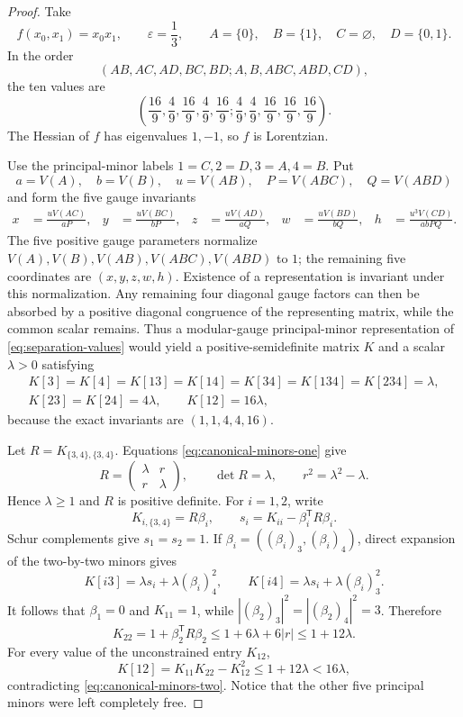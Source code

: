 \documentclass[11pt]{article}
\theoremstyle{remark}
\begin{document}
\begin{proof}
Take
\[
 f(x_0,x_1)=x_0x_1,\qquad \varepsilon=\frac13,
 \qquad A=\{0\},\quad B=\{1\},\quad C=\varnothing,
 \quad D=\{0,1\}.
\]
In the order
\[
 (AB,AC,AD,BC,BD;A,B,ABC,ABD,CD),
\]
the ten values are
\begin{equation}
 \left(
 \frac{16}{9},\frac49,\frac{16}{9},\frac49,\frac{16}{9};
 \frac49,\frac49,\frac{16}{9},\frac{16}{9},\frac{16}{9}
 \right).
 \label{eq:separation-values}
\end{equation}
The Hessian of $f$ has eigenvalues $1,-1$, so $f$ is Lorentzian.

Use the principal-minor labels $1=C,2=D,3=A,4=B$.  Put
\[
 a=V(A),\quad b=V(B),\quad u=V(AB),\quad
 P=V(ABC),\quad Q=V(ABD)
\]
and form the five gauge invariants
\begin{align*}
 x&=\frac{uV(AC)}{aP},&
 y&=\frac{uV(BC)}{bP},&
 z&=\frac{uV(AD)}{aQ},&
 w&=\frac{uV(BD)}{bQ},&
 h&=\frac{u^3V(CD)}{abPQ}.
\end{align*}
The five positive gauge parameters normalize
$V(A),V(B),V(AB),V(ABC),V(ABD)$ to $1$; the remaining five coordinates are
$(x,y,z,w,h)$.  Existence of a representation is invariant under this
normalization.  Any remaining four diagonal gauge factors can then be
absorbed by a positive diagonal congruence of the representing matrix, while
the common scalar remains.  Thus a modular-gauge principal-minor
representation of \eqref{eq:separation-values} would yield a
positive-semidefinite matrix $K$ and a scalar $\lambda>0$ satisfying
\begin{gather}
 K[3]=K[4]=K[13]=K[14]=K[34]=K[134]=K[234]=\lambda,
 \label{eq:canonical-minors-one}\\
 K[23]=K[24]=4\lambda,\qquad K[12]=16\lambda,
 \label{eq:canonical-minors-two}
\end{gather}
because the exact invariants are $(1,1,4,4,16)$.

Let $R=K_{\{3,4\},\{3,4\}}$.  Equations
\eqref{eq:canonical-minors-one} give
\[
 R=\begin{pmatrix}\lambda&r\\r&\lambda\end{pmatrix},
 \qquad \det R=\lambda,
 \qquad r^2=\lambda^2-\lambda.
\]
Hence $\lambda\geq1$ and $R$ is positive definite.  For $i=1,2$, write
\[
 K_{i,\{3,4\}}=R\beta_i,
 \qquad s_i=K_{ii}-\beta_i^{\mathsf T}R\beta_i.
\]
Schur complements give $s_1=s_2=1$.  If
$\beta_i=((\beta_i)_3,(\beta_i)_4)$, direct expansion of the two-by-two
minors gives
\[
 K[i3]=\lambda s_i+\lambda(\beta_i)_4^2,
 \qquad
 K[i4]=\lambda s_i+\lambda(\beta_i)_3^2.
\]
It follows that $\beta_1=0$ and $K_{11}=1$, while
$| (\beta_2)_3|^2=|(\beta_2)_4|^2=3$.  Therefore
\[
 K_{22}=1+\beta_2^{\mathsf T}R\beta_2
 \leq1+6\lambda+6|r|
 \leq1+12\lambda.
\]
For every value of the unconstrained entry $K_{12}$,
\[
 K[12]=K_{11}K_{22}-K_{12}^2
 \leq1+12\lambda<16\lambda,
\]
contradicting \eqref{eq:canonical-minors-two}.  Notice that the other five
principal minors were left completely free.
\end{proof}
\end{document}
